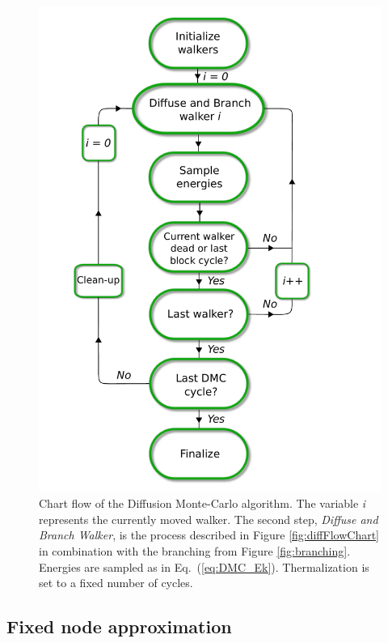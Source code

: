 \begin{figure}[ht]
 \begin{center}
  \includegraphics[scale=0.65]{../Graphics/DMCUML.pdf}
  \caption{Chart flow of the Diffusion Monte-Carlo algorithm. The variable \textit{i} represents the currently moved walker. The second step, \textit{Diffuse and Branch Walker}, is the process described in Figure \ref{fig:diffFlowChart} in combination with the branching from Figure \ref{fig:branching}. Energies are sampled as in Eq.~(\ref{eq:DMC_Ek}). Thermalization is set to a fixed number of cycles.}
  \label{fig:DMCchart}
 \end{center}
\end{figure}
\clearpage

\subsection{Fixed node approximation}

